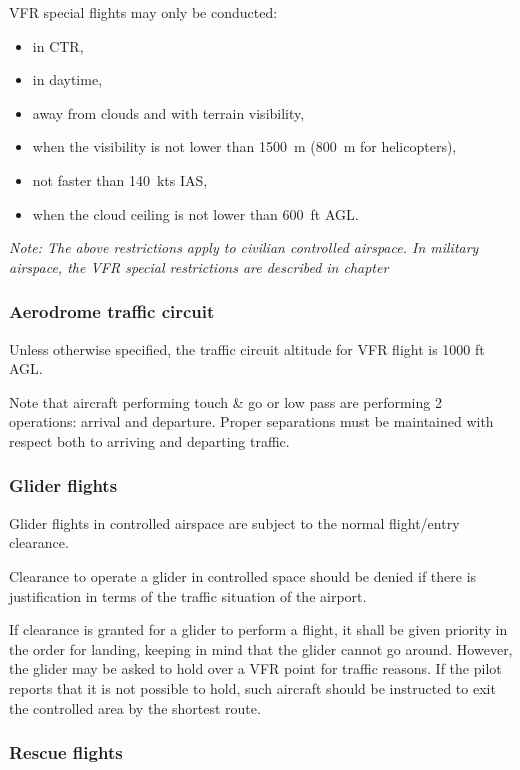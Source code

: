VFR special flights may only be conducted:
\begin{itemize}
	\item in CTR,
	\item in daytime,
	\item away from clouds and with terrain visibility,
	\item when the visibility is not lower than 1500~m (800~m for helicopters),
	\item not faster than 140~kts IAS,
	\item when the cloud ceiling is not lower than 600~ft AGL.\@
\end{itemize}

\emph{Note: The above restrictions apply to civilian controlled airspace. In military airspace, the VFR special restrictions are described in chapter }

\subsubsection{Aerodrome traffic circuit}
Unless otherwise specified, the traffic circuit altitude for VFR flight is 1000 ft AGL.\@

Note that aircraft performing touch \& go or low pass are performing 2 operations: arrival and departure. Proper separations must be maintained with respect both to arriving and departing traffic.

\subsubsection{Glider flights}
Glider flights in controlled airspace are subject to the normal flight/entry clearance.

Clearance to operate a glider in controlled space should be denied if there is justification in terms of the traffic situation of the airport.

If clearance is granted for a glider to perform a flight, it shall be given priority in the order for landing, keeping in mind that the glider cannot go around. However, the glider may be asked to hold over a VFR point for traffic reasons. If the pilot reports that it is not possible to hold, such aircraft should be instructed to exit the controlled area by the shortest route.

\subsubsection{Rescue flights}

